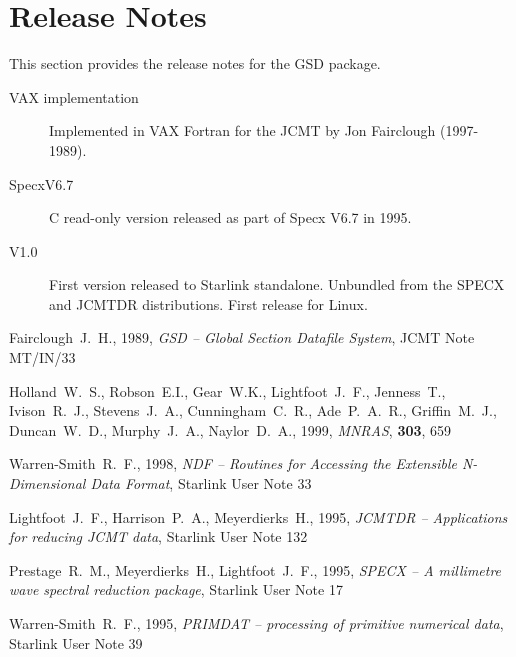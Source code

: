\documentclass[twoside,11pt]{article}
\newcommand{\xref}[3]{#1}
\renewcommand{\_}{\texttt{\symbol{95}}}
\begin{document}
\section{Release Notes}

This section provides the release notes for the GSD package.

\begin{description}
\item[VAX implementation] \mbox{}

Implemented in VAX Fortran for the JCMT by Jon Fairclough (1997-1989).

\item[SpecxV6.7] \mbox{}

C read-only version released as part of Specx V6.7 in 1995.

\item[V1.0] \mbox{}

First version released to Starlink standalone. Unbundled from the
SPECX and JCMTDR distributions. First release for Linux.

\end{description}

\begin{thebibliography}{}

Fairclough~J.~H., 1989, {\it GSD -- Global Section Datafile System},
JCMT Note MT/IN/33

Holland~W.~S., Robson~E.I., Gear~W.K., Lightfoot~J.~F., Jenness~T.,
Ivison~R.~J., Stevens~J.~A., Cunningham~C.~R., Ade~P.~A.~R.,
Griffin~M.~J., Duncan~W.~D., Murphy~J.~A., Naylor~D.~A., 1999,
\textit{MNRAS}, \textbf{303}, 659

Warren-Smith~R.~F., 1998, {\it NDF -- Routines for Accessing the Extensible
N-Dimensional Data Format}, \xref{Starlink User Note 33}{sun33}{}

Lightfoot~J.~F., Harrison~P.~A., Meyerdierks~H., 1995,
{\it JCMTDR -- Applications for reducing JCMT data},
\xref{Starlink User Note 132}{sun132}{}

Prestage~R.~M., Meyerdierks~H., Lightfoot~J.~F., 1995, {\it SPECX -- A
millimetre wave spectral reduction package},
\xref{Starlink User Note 17}{sun17}{}

Warren-Smith~R.~F., 1995, {\it PRIMDAT -- processing of primitive numerical
data}, \xref{Starlink User Note 39}{sun39}{}

\end{thebibliography}
\end{document}
